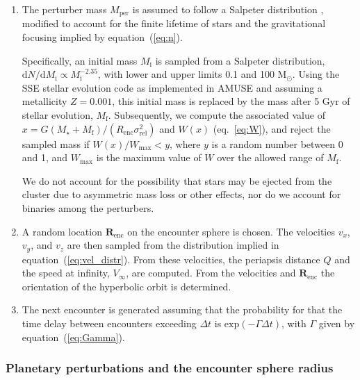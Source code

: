 \documentclass[iop,usenatbib]{emulateapj}
\newcommand{\ve}[1]{\boldsymbol{#1}}
\newcommand{\msun}{\mathrm{M}_\odot}
\newcommand{\renc}{R_\mathrm{enc}}
\newcommand{\mper}{M_\mathrm{per}}
\newcommand{\srel}{\sigma_\mathrm{rel}}
\begin{document}
\begin{enumerate}

\item The perturber mass $\mper$ is assumed to follow a Salpeter distribution \citep{1955ApJ...121..161S}, modified to account for the finite lifetime of stars and the gravitational focusing implied by equation~(\ref{eq:n}). 

Specifically, an initial mass $M_\mathrm{i}$ is sampled from a Salpeter distribution, $\mathrm{d}N/\mathrm{d}M_\mathrm{i}\propto M_\mathrm{i}^{-2.35}$, with lower and upper limits 0.1 and 100 $\msun$. Using the \textsc{SSE} stellar evolution code \citep{2000MNRAS.315..543H} as implemented in \textsc{AMUSE} \citep{2013CoPhC.183..456P,2013A&A...557A..84P} and assuming a metallicity $Z=0.001$, this initial mass is replaced by the mass after 5 Gyr of stellar evolution, $M_\mathrm{f}$. Subsequently, we compute the associated value of $x = G(M_\star+M_\mathrm{f})/(\renc \srel^2)$ and $W(x)$ (eq.~\ref{eq:W}), and reject the sampled mass if $W(x)/W_\mathrm{max} < y$, where $y$ is a random number between 0 and 1, and $W_\mathrm{max}$ is the maximum value of $W$ over the allowed range of $M_\mathrm{f}$. 

We do not account for the possibility that stars may be ejected from the cluster due to asymmetric mass loss or other effects, nor do we account for binaries among the perturbers. 

\item A random location $\ve{R}_\mathrm{enc}$ on the encounter sphere is chosen.  The velocities $v_x$, $v_y$, and $v_z$ are then sampled from the distribution implied in equation~(\ref{eq:vel_distr}). From these velocities, the periapsis distance $Q$ and the speed at infinity, $V_\infty$, are computed. From the velocities and $\ve{R}_\mathrm{enc}$ the orientation of the hyperbolic orbit is determined.  

\item The next encounter is generated assuming that the probability for that the time delay between encounters exceeding $\Delta t$ is $\mathrm{exp}(- \Gamma \Delta t)$, with $\Gamma$ given by equation~(\ref{eq:Gamma}).  

\end{enumerate}

\subsubsection{Planetary perturbations and the encounter sphere radius}
\label{sect:pop_syn:enc_gen:per}
\end{document}

